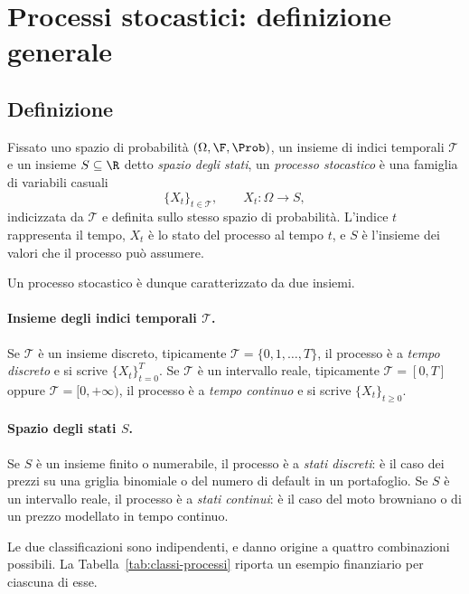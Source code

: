 \section{Processi stocastici: definizione generale}

\subsection{Definizione}

\noindent
Fissato uno spazio di probabilit\`{a} $(\Omega,\F,\Prob)$, un insieme
di indici temporali $\mathcal{T}$ e un insieme $S\subseteq\R$ detto
\emph{spazio degli stati}, un \emph{processo stocastico} \`{e} una
famiglia di variabili casuali
\[
\{X_t\}_{t\in\mathcal{T}}, \qquad X_t:\Omega\rightarrow S,
\]
indicizzata da $\mathcal{T}$ e definita sullo stesso spazio di
probabilit\`{a}. L'indice $t$ rappresenta il tempo, $X_t$ \`{e} lo
stato del processo al tempo $t$, e $S$ \`{e} l'insieme dei valori che
il processo pu\`{o} assumere.

Un processo stocastico \`{e} dunque caratterizzato da due insiemi.

\paragraph{Insieme degli indici temporali $\mathcal{T}$.}
Se $\mathcal{T}$ \`{e} un insieme discreto, tipicamente
$\mathcal{T}=\{0,1,\ldots,T\}$, il processo \`{e} a \emph{tempo
discreto} e si scrive $\{X_t\}_{t=0}^{T}$. Se $\mathcal{T}$ \`{e} un
intervallo reale, tipicamente $\mathcal{T}=[0,T]$ oppure
$\mathcal{T}=[0,+\infty)$, il processo \`{e} a \emph{tempo continuo}
e si scrive $\{X_t\}_{t\geq 0}$.

\paragraph{Spazio degli stati $S$.}
Se $S$ \`{e} un insieme finito o numerabile, il processo \`{e} a
\emph{stati discreti}: \`{e} il caso dei prezzi su una griglia
binomiale o del numero di default in un portafoglio. Se $S$ \`{e} un
intervallo reale, il processo \`{e} a \emph{stati continui}: \`{e} il
caso del moto browniano o di un prezzo modellato in tempo continuo.

Le due classificazioni sono indipendenti, e danno origine a quattro
combinazioni possibili. La Tabella~\ref{tab:classi-processi} riporta
un esempio finanziario per ciascuna di esse.

